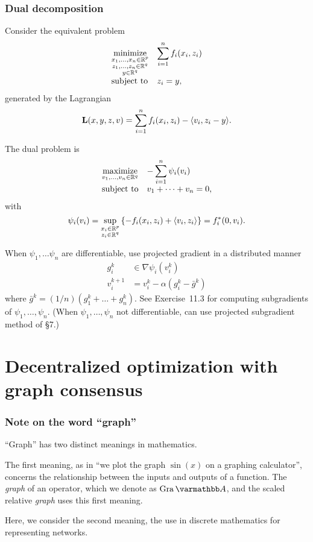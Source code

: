 \documentclass[10pt,mathserif]{beamer}
\begin{document}
\begin{frame}
\frametitle{Dual decomposition}
Consider the equivalent problem
\[
\begin{array}{ll}
\underset{\substack{x_1,\dots,x_n\in\mathbb{R}^p\\z_1,\dots,z_n\in \mathbb{R}^q\\y\in \mathbb{R}^q}}{\mbox{minimize}} &\displaystyle{\sum_{i=1}^n f_i(x_i,z_i)}\\
\mbox{subject to}&z_i=y,
\end{array}
\]
generated by the Lagrangian
\[
\mathbf{L}(x,y,z,v)=\sum^n_{i=1} f_i(x_i,z_i)-\langle v_i,z_i-y\rangle.
\]
\end{frame}


\begin{frame}[plain]
The dual problem is
\[
\begin{array}{ll}
\underset{v_1,\dots,v_n\in \mathbb{R}^q}{\mbox{maximize}} &\displaystyle{-\sum_{i=1}^n \psi_i(v_i)}\\
\mbox{subject to}&v_1+\dots+v_n=0,
\end{array}
\]
with
\[
\psi_i(v_i)=\sup_{\substack{x_i\in\mathbb{R}^p\\z_i\in \mathbb{R}^q}}\left\{-f_i(x_i,z_i)+\langle v_i,z_i\rangle\right\}=f_i^*(0,v_i).
\]
\vspace{0.2in}

When $\psi_1,\dots\psi_n$ are differentiable, use projected gradient in a distributed manner
\begin{align*}
g_i^k&\in \nabla \psi_i(v^k_i)\\
v^{k+1}_i&=v^k_i-\alpha (g^k_i-\bar{g}^k)
\end{align*}
where $\bar{g}^k=(1/n)(g^k_1+\dots+g^k_n)$.
See Exercise~11.3 for computing subgradients of $\psi_1,\dots,\psi_n$.
(When $\psi_1,\dots,\psi_n$  not differentiable, can use projected subgradient method of \S7.)
\end{frame}


\section{Decentralized optimization with graph consensus}




\begin{frame}
\frametitle{Note on the word ``graph''}
``Graph'' has two distinct meanings in mathematics.
\vspace{0.2in}

The first meaning, as in ``we plot the graph $\sin (x)$ on a graphing calculator'', concerns the relationship between the inputs and outputs of a function. The \emph{graph} of an operator, which we denote as $\gra \opA$, and the scaled relative \emph{graph} uses this first meaning.

\vspace{0.2in}
Here, we consider the second meaning, the use in discrete mathematics for representing networks.
\end{frame}
\end{document}
